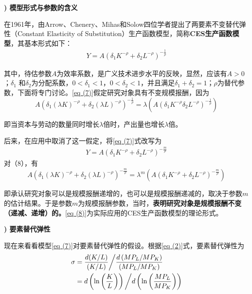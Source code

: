 	{\bf {}) 模型形式与参数的含义}
		
	在1961年，由Arrow、Chenery、Mihas和Solow四位学者提出了两要素不变替代弹性（Constant Elasticity of Substitution）生产函数模型，简称\textbf{CES生产函数模型}，其基本形式如下：
	\begin{align}
		Y=A\left(\delta_{1} K^{-\rho}+\delta_{2} L^{-\rho}\right)^{-\frac{1}{\rho}} \label{eq (7)}
	\end{align}	
		
	其中，待估参数$ A $为效率系数，是广义技术进步水平的反映，显然，应该有$ A>0 $；$ \delta _{1} $
	和$ \delta _{2} $为分配系数，$ 0<\delta_{1}<1 $，$ 0<\delta_{2}<1 $，并且满足$ \delta_{1}+\delta_{2}=1 $；$ \rho $为替代参数，下面将专门讨论。\eqref{eq (7)}假定研究对象具有不变规模报酬，因为
	$$ A\left(\delta_{1}(\lambda K)^{-\rho}+\delta_{2}(\lambda L)^{-\rho}\right)^{-\frac{1}{\rho}}
		=\lambda\left(A\left(\delta_{1} K^{-\rho} \delta_{2} L^{-\rho}\right)^{-\frac{1}{\rho}}\right) $$
		
	即当资本与劳动的数量同时增长$ \lambda $倍时，产出量也增长$ \lambda $倍。
		
	后来，在应用中取消了这一假定，将\eqref{eq (7)}式改写为
	\begin{align}
		Y=A\left(\delta_{1} K^{-\rho}+\delta_{2} L^{-\rho}\right)^{-\frac{m}{\rho}} \label{eq (8)}
	\end{align}
	对（8），有
	$$ A\left(\delta_{1}(\lambda K)^{-\rho}+\delta_{2}(\lambda L)^{-\rho}\right)^{-\frac{m}{\rho}}=\lambda^{m}
	    \left(A\left(\delta_{1} K^{-\rho}+\delta_{2} L^{-\rho}\right)^{-\frac{m}{\rho}}\right) $$
		
	即承认研究对象可以是规模报酬递增的，也可以是规模报酬递减的，取决于参数$ m $的估计结果。于是参数$ m $为规模报酬参数，当时，\textbf{表明研究对象是规模报酬不变（递减、递增）的。}\eqref{eq (8)}为实际应用的CES生产函数模型的理论形式。
		
	{\bf {}) 要素替代弹性}
		
	现在来看看模型\eqref{eq (7)}对要素替代弹性的假设。根据\eqref{eq (2)}式，要素替代弹性为
	\begin{equation}
		\begin{aligned}
			\sigma & = \frac{d(K / L)}{(K / L)} \bigg/ \frac{d\left(M P_{L} / M P_{K}\right)}{\left(M P_{L} / M P_{K}\right)} \\
			& = d\left(\ln \left(\frac{K}{L}\right)\right) \bigg/ d\left(\ln \left(\frac{M P_{L}}{M P_{K}}\right)\right) \notag
		\end{aligned}
	\end{equation}

